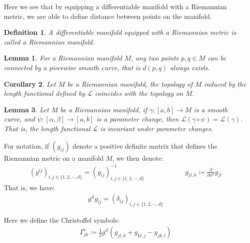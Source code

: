 \documentclass[11pt]{book}
\theoremstyle{break}
\theoremstyle{break}
\newtheorem{lem}{Lemma}[thm]
\newtheorem{corT}[lem]{Corollary}
\newtheorem{defn}{Definition}[corL]
\newcommand{\pd}{\partial}
\begin{document}
Here we see that by equipping a differentiable manifold with a Riemannian metric, we are able to define distance between points on the manifold. 
\begin{defn}
A differentiable manifold equipped with a Riemannian metric is called a Riemannian manifold. 
\end{defn}

\begin{lem}
For a Riemannian manifold $M$, any two points $p,q \in M$ can be connected by a piecewise smooth curve, that is $d(p,q)$ always exists.
\end{lem}

\begin{corT}
Let $M$ be a Riemannian manifold, the topology of $M$ induced by the length functional defined by $\mathcal{L}$ coincides with the topology on $M$. 
\end{corT}

\begin{lem}
Let $M$ be a Riemannian manifold, if $\gamma:[a,b]\to M$ is a smooth curve, and $\psi:[\alpha,\beta] \to [a,b]$ is a parameter change, then $\mathcal{L}(\gamma\circ \psi) = \mathcal{L}(\gamma)$. That is, the length functional $\mathcal{L}$ is invariant under parameter changes. 
\end{lem}

For notation, if $(g_{ij})$ denote a positive definite matrix that defines the Riemannian metric on a manifold $M$, we then denote:
\begin{align*}
(g^{ij})_{i,j \in\{1,2,\cdots, d\}} = \left( g_{ij}\right)^{-1}_{i,j \in\{1,2,\cdots, d\}}\qquad\qquad\qquad g_{jl, k}\coloneqq \frac{\pd}{\pd x^k}g_{jl}
\end{align*}
That is, we have:
\begin{align*}
g^{il}g_{lj} = (\delta_{ij})_{i,j \in\{1,2,\cdots, d\}}
\end{align*}

Here we define the Christoffel symbols:
\begin{align*}
\Gamma_{jk}^i \coloneqq \frac{1}{2}g^{il}\left( g_{jl,k} + g_{kl,j} - g_{jk,l}\right)
\end{align*}
\end{document}
